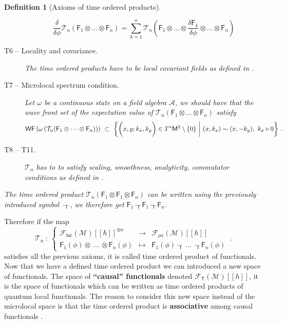 \documentclass[11pt]{book}
\newcommand{\WF}{\mathsf{WF}}
\newcommand{\loc}{\mathsf{loc}}
\newcommand{\muc}{\mu\csf}
\newcommand{\Acal}{\mathcal{A}}
\newcommand{\Fcal}{\mathcal{F}}
\newcommand{\Mcal}{\mathcal{M}}
\newcommand{\Tcal}{\mathcal{T}}
\newcommand{\Fsf}{\mathsf{F}}
\newcommand{\Msf}{\mathsf{M}}
\newcommand{\Tsf}{\mathsf{T}}
\newcommand{\csf}{\mathsf{c}}
\theoremstyle{break}
\newtheorem{definition}{Definition}[chapter]
\begin{document}
\begin{definition}[Axioms of time ordered products]
\begin{description}
\begin{equation*}
\frac{\delta}{\delta\phi} \Tcal_n(\Fsf_1\otimes\dots\otimes\Fsf_n) = \sum_{k=1}^n \Tcal_n\left(\Fsf_1\otimes\dots\otimes \frac{\delta\Fsf_k}{\delta\phi} \otimes\dots\otimes\Fsf_n\right)
\end{equation*}
%
\item[T6 -- Locality and covariance.]\label{item:T6} The time ordered products have to be local covariant fields as defined in \cite{hollands_local_2001}.
%
\item[T7 -- Microlocal spectrum condition.]\label{item:T7} Let $\omega$ be a continuous state on a field algebra $\Acal$, we should have that the wave front set of the expectation value of $\Tcal_n(\Fsf_1\otimes\dots\otimes\Fsf_n)$ satisfy 
%
\begin{equation*}
\WF\left(\omega\left(\Tcal_n(\Fsf_1\otimes\dots\otimes\Fsf_n)\right)\right) \ \subset \ \bigg\{ \bigg( x, y ; k_x, k_y \bigg) \in T^\ast\Msf^2 \setminus \{0\} \ \bigg| \ (x,k_x) \sim (x,-k_y), \ k_x \triangleright 0 \bigg\} \ .
\vspace*{-10pt}
\end{equation*}
%
\item[T8 -- T11.]\label{item:T8_T11} $\Tcal_n$ has to to satisfy scaling, smoothness, analyticity, commutator conditions as defined in \cite{hollands_local_2001}.
\end{description}
%
The time ordered product $\Tcal_n(\Fsf_1\otimes\Fsf_1\otimes\Fsf_n)$ can be written using the previously introduced symbol $\cdot_\Tsf$, we therefore get $\Fsf_1\cdot_\Tsf\Fsf_1\cdot_\Tsf\Fsf_n$. 
\end{definition}

Therefore if the map
%
\begin{equation*}
\Tcal_n \ : \ 
\left\{
\begin{array}{lcl}
\Fcal_{\loc}(\Mcal)[[\hbar]]^{\otimes n} & \to & \Fcal_{\muc}(\Mcal)[[\hbar]] \\
\Fsf_1(\phi) \otimes \ ... \ \otimes \Fsf_n(\phi) & \mapsto & \Fsf_1(\phi) \cdot_{\Tsf} \ ... \ \cdot_{\Tsf} \Fsf_n(\phi)
\end{array}
\right. \ .
\end{equation*}
%
satisfies all the previous axioms, it is called time ordered product of functionals. Now that we have a defined time ordered product we can introduced a new space of functionals.  The space of \textbf{``causal'' functionals} denoted $\Fcal_\Tsf(\Mcal)[[\hbar]]$\index{$\Fcal_\Tsf(\Mcal)$}, it is the space of functionals which can be written as time ordered products of quantum local functionals. The reason to consider this new space instead of the microlocal space is that the time ordered product is \textbf{associative} among causal functionals \cite{fredenhagen_batalin-vilkovisky_2013}.
\end{document}
